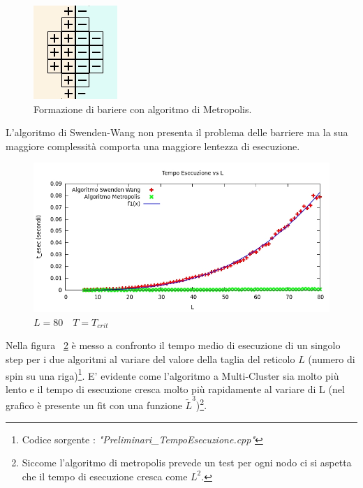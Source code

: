 \documentclass[11pt]{article}
\theoremstyle{plain}
\begin{document}
     \begin {figure}
      \begin{center}
		\caption{\footnotesize  Formazione di bariere con algoritmo di Metropolis.}\label{fig:bariera spin}
        \includegraphics[scale=0.5]{Immagini/bariera.jpg}
      \end{center}
    \end {figure} 

L'algoritmo di Swenden-Wang non presenta il problema delle barriere ma la sua maggiore complessità comporta una maggiore lentezza di esecuzione.
     \begin {figure}
      \begin{center}
		\caption{\footnotesize  $L = 80\quad T=T_{crit}$}\label{fig:t_esec}
        \includegraphics[scale=0.5]{Immagini/t_esec.jpg}
      \end{center}
    \end {figure} 
Nella figura ~\ref{fig:t_esec} è messo a confronto il tempo medio di esecuzione di un singolo step per i due algoritmi al variare del valore della taglia del reticolo $L$ (numero di spin su una riga)\footnote{Codice sorgente : \emph{"Preliminari\_TempoEsecuzione.cpp"}}.
E' evidente come l'algoritmo a Multi-Cluster sia molto più lento e il tempo di esecuzione cresca molto più rapidamente al variare di L (nel grafico è presente un fit con una funzione $\tilde L^3$)\footnote{Siccome l'algoritmo di metropolis prevede un test per ogni nodo ci si aspetta che il tempo di esecuzione cresca come $L^2$.}.
\end{document}
